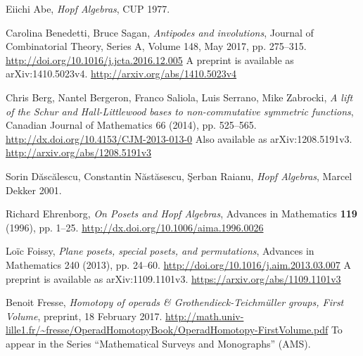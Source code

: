\documentclass[12pt]{article}
\theoremstyle{plain}
\theoremstyle{definition}
\theoremstyle{remark}
\begin{document}
\begin{thebibliography}{10}                                                                                         %

Eiichi Abe, \textit{Hopf Algebras}, CUP 1977.

Carolina Benedetti, Bruce Sagan,
\textit{Antipodes and involutions},
Journal of Combinatorial Theory, Series A,
Volume 148, May 2017, pp. 275--315.
\newline\url{http://doi.org/10.1016/j.jcta.2016.12.005}
\newline A preprint is available as arXiv:1410.5023v4.\newline
\url{http://arxiv.org/abs/1410.5023v4}

Chris Berg, Nantel Bergeron, Franco Saliola, Luis
Serrano, Mike Zabrocki, \textit{A lift of the Schur and Hall-Littlewood bases
to non-commutative symmetric functions}, Canadian Journal of Mathematics 66
(2014), pp. 525--565.\newline
\url{http://dx.doi.org/10.4153/CJM-2013-013-0}
\newline Also available as arXiv:1208.5191v3.\newline
\url{http://arxiv.org/abs/1208.5191v3}

Sorin D\u{a}sc\u{a}lescu, Constantin
N\u{a}st\u{a}sescu, \c{S}erban Raianu, \textit{Hopf Algebras}, Marcel Dekker 2001.

Richard Ehrenborg,
\textit{On Posets and Hopf Algebras},
Advances in Mathematics \textbf{119} (1996), pp. 1--25.
\newline\url{http://dx.doi.org/10.1006/aima.1996.0026}

Lo\"ic Foissy,
\textit{Plane posets, special posets, and permutations},
Advances in Mathematics 240 (2013), pp. 24--60.
\newline\url{http://doi.org/10.1016/j.aim.2013.03.007}
\newline A preprint is available as arXiv:1109.1101v3.\newline
\url{https://arxiv.org/abs/1109.1101v3}

Benoit Fresse, \textit{Homotopy of operads \&
Grothendieck-Teichm\"{u}ller groups, First Volume},
preprint, 18 February 2017.\newline
\url{http://math.univ-lille1.fr/~fresse/OperadHomotopyBook/OperadHomotopy-FirstVolume.pdf}
\newline
To appear in the Series ``Mathematical Surveys and Monographs'' (AMS).


\end{thebibliography}
\end{document}

